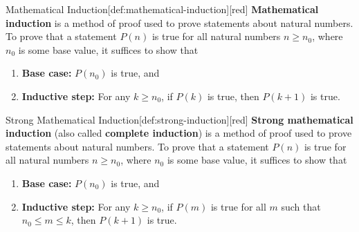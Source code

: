 




\newpage
\begin{define}{Mathematical Induction}[def:mathematical-induction][red]
  \textbf{Mathematical induction} is a method of proof used to prove statements about natural numbers.
  To prove that a statement \(P(n)\) is true for all natural numbers \(n \geq n_{0}\), where \(n_{0}\) is some base value, it suffices to show that
  \begin{enumerate}
    \item \textbf{Base case:} \(P(n_{0})\) is true, and
    \item \textbf{Inductive step:} For any \(k \geq n_{0}\), if \(P(k)\) is true, then \(P(k+1)\) is true.
  \end{enumerate}
\end{define}

\begin{define}{Strong Mathematical Induction}[def:strong-induction][red]
  \textbf{Strong mathematical induction} (also called \textbf{complete induction}) is a method of proof used to prove statements about natural numbers.
  To prove that a statement \(P(n)\) is true for all natural numbers \(n \geq n_{0}\), where \(n_{0}\) is some base value, it suffices to show that
  \begin{enumerate}
    \item \textbf{Base case:} \(P(n_{0})\) is true, and
    \item \textbf{Inductive step:} For any \(k \geq n_{0}\), if \(P(m)\) is true for all \(m\) such that \(n_{0} \leq m \leq k\), then \(P(k+1)\) is true.
  \end{enumerate}
\end{define}

